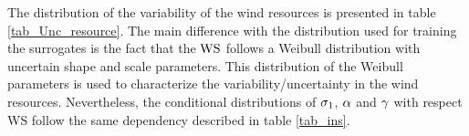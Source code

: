 \documentclass[preprint,12pt]{elsarticle}
\begin{document}
The distribution of the variability of the wind resources is presented in table \ref{tab_Unc_resource}. The main difference with the distribution used for training the surrogates is the fact that the $\text{WS}$ follows a Weibull distribution with uncertain shape and scale parameters. This distribution of the Weibull parameters is used to characterize the variability/uncertainty in the wind resources. Nevertheless, the conditional distributions of $\sigma_{1}$, $\alpha$ and $\gamma$ with respect WS follow the same dependency described in table \ref{tab_ins}. 

\begin{multicols}{2}
\begin{table}[H]
\begin{centering}
\caption{Uncertainty in wind resources.}
\label{tab_Unc_resource}
\end{centering}
\end{table}


\end{multicols}
\end{document}
